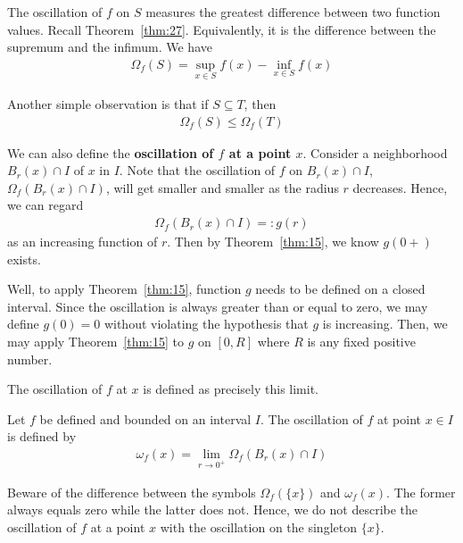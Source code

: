 \documentclass[thmcnt=section, 12pt]{my-elegantbook}
\begin{document}
The oscillation of $f$ on $S$ measures the
greatest difference between two function values.
Recall Theorem~\ref{thm:27}.
Equivalently, it is the difference between
the supremum and the infimum.
We have
\begin{align*}
    \Omega_f (S)
    = \sup_{x \in S} f(x) - \inf_{x \in S} f(x)
\end{align*}

Another simple observation is that
if $S \subseteq T$, then
\begin{align*}
    \Omega_f(S) \leq \Omega_f(T)
\end{align*}


We can also define the \textbf{oscillation of $f$ at a point $x$}.
Consider a neighborhood $B_r(x) \cap I$ of $x$ in $I$.
Note that the oscillation of $f$ on $B_r(x) \cap I$,
$\Omega_f(B_r(x) \cap I)$,
will get smaller and smaller
as the radius $r$ decreases.
Hence, we can regard
\begin{align*}
    \Omega_f (B_r(x) \cap I) =: g(r)
\end{align*}
as an increasing function of $r$.
Then by Theorem~\ref{thm:15},
we know $g(0+)$ exists.
\begin{note}
    Well, to apply Theorem~\ref{thm:15},
    function $g$ needs to be defined on a closed interval.
    Since the oscillation is always greater than or equal to zero,
    we may define $g(0) = 0$
    without violating the hypothesis that $g$ is increasing.
    Then, we may apply Theorem~\ref{thm:15} to $g$ on $[0, R]$
    where $R$ is any fixed positive number.
\end{note}
\noindent The oscillation of $f$ at $x$ is defined as
precisely this limit.

\begin{definition} \label{def:8}
    Let $f$ be defined and bounded on an interval $I$.
    The oscillation of $f$ at point $x \in I$ is
    defined by
    \begin{align*}
        \omega_f(x)
        = \lim_{r \to 0^{+}} \Omega_f (B_r(x) \cap I)
    \end{align*}
\end{definition}

\begin{note}
    Beware of the difference between the symbols $\Omega_f(\{x\})$
    and $\omega_f(x)$.
    The former always equals zero while the latter does not.
    Hence, we do not describe the oscillation of $f$ at a point $x$
    with the oscillation on the singleton $\{x\}$.
\end{note}
\end{document}
